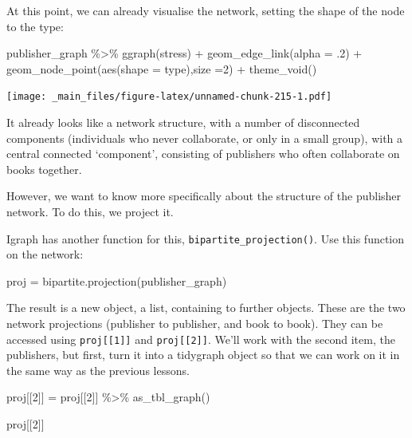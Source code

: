 \documentclass[
]{book}
\newenvironment{Shaded}{\begin{snugshade}}{\end{snugshade}}
\newcommand{\AttributeTok}[1]{\textcolor[rgb]{0.77,0.63,0.00}{#1}}
\newcommand{\DecValTok}[1]{\textcolor[rgb]{0.00,0.00,0.81}{#1}}
\newcommand{\FunctionTok}[1]{\textcolor[rgb]{0.00,0.00,0.00}{#1}}
\newcommand{\NormalTok}[1]{#1}
\newcommand{\OtherTok}[1]{\textcolor[rgb]{0.56,0.35,0.01}{#1}}
\newcommand{\SpecialCharTok}[1]{\textcolor[rgb]{0.00,0.00,0.00}{#1}}
\newcommand{\StringTok}[1]{\textcolor[rgb]{0.31,0.60,0.02}{#1}}
\begin{document}
At this point, we can already visualise the network, setting the shape of the node to the type:

\begin{Shaded}
\begin{Highlighting}[]
\NormalTok{publisher\_graph }\SpecialCharTok{\%\textgreater{}\%} 
  \FunctionTok{ggraph}\NormalTok{(}\StringTok{\textquotesingle{}stress\textquotesingle{}}\NormalTok{) }\SpecialCharTok{+}
  \FunctionTok{geom\_edge\_link}\NormalTok{(}\AttributeTok{alpha =}\NormalTok{ .}\DecValTok{2}\NormalTok{) }\SpecialCharTok{+} 
  \FunctionTok{geom\_node\_point}\NormalTok{(}\FunctionTok{aes}\NormalTok{(}\AttributeTok{shape =}\NormalTok{ type),}\AttributeTok{size =}\DecValTok{2}\NormalTok{) }\SpecialCharTok{+} 
  \FunctionTok{theme\_void}\NormalTok{()}
\end{Highlighting}
\end{Shaded}

\texttt{[image: \_main\_files/figure-latex/unnamed-chunk-215-1.pdf]}

It already looks like a network structure, with a number of disconnected components (individuals who never collaborate, or only in a small group), with a central connected `component', consisting of publishers who often collaborate on books together.

However, we want to know more specifically about the structure of the publisher network. To do this, we project it.

Igraph has another function for this, \texttt{bipartite\_projection()}. Use this function on the network:

\begin{Shaded}
\begin{Highlighting}[]
\NormalTok{proj }\OtherTok{=} \FunctionTok{bipartite.projection}\NormalTok{(publisher\_graph)}
\end{Highlighting}
\end{Shaded}

The result is a new object, a list, containing to further objects. These are the two network projections (publisher to publisher, and book to book). They can be accessed using \texttt{proj{[}{[}1{]}{]}} and \texttt{proj{[}{[}2{]}{]}}. We'll work with the second item, the publishers, but first, turn it into a tidygraph object so that we can work on it in the same way as the previous lessons.

\begin{Shaded}
\begin{Highlighting}[]
\NormalTok{proj[[}\DecValTok{2}\NormalTok{]] }\OtherTok{=}\NormalTok{ proj[[}\DecValTok{2}\NormalTok{]] }\SpecialCharTok{\%\textgreater{}\%} \FunctionTok{as\_tbl\_graph}\NormalTok{()}

\NormalTok{proj[[}\DecValTok{2}\NormalTok{]] }
\end{Highlighting}
\end{Shaded}
\end{document}
